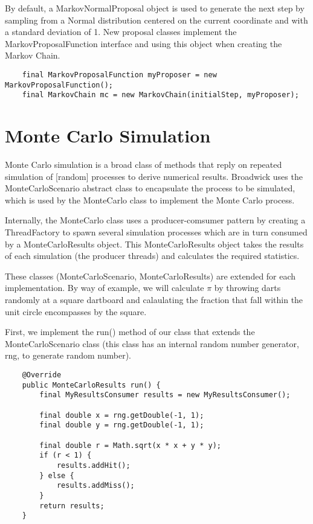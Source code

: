 By default, a MarkovNormalProposal object is used to generate the next step by sampling from a Normal distribution centered on the current coordinate and with a standard deviation of 1. New proposal classes implement the MarkovProposalFunction interface and using this object when creating the Markov Chain.

\begin{lstlisting}
    final MarkovProposalFunction myProposer = new MarkovProposalFunction();
    final MarkovChain mc = new MarkovChain(initialStep, myProposer);
\end{lstlisting}


\section{Monte Carlo Simulation}
Monte Carlo simulation is a broad class of methods that reply on repeated simulation of [random] processes to derive numerical results. Broadwick uses the MonteCarloScenario abstract class to encapsulate the process to be simulated, which is used by the MonteCarlo class to implement the Monte Carlo process.

Internally, the MonteCarlo class uses a producer-comsumer pattern by creating a ThreadFactory to spawn several simulation processes which are in turn consumed by a MonteCarloResults object. This MonteCarloResults object takes the results of each simulation (the producer threads) and calculates the required statistics.

These classes (MonteCarloScenario, MonteCarloResults) are extended for each implementation. By way of example, we will calculate $\pi$ by throwing darts randomly at a square dartboard and calaulating the fraction that fall within the unit circle encompasses by the square.

First, we implement the run() method of our class that extends the MonteCarloScenario class (this class has an internal random number generator, rng, to generate random number).
\begin{lstlisting}
    @Override
    public MonteCarloResults run() {
        final MyResultsConsumer results = new MyResultsConsumer();

        final double x = rng.getDouble(-1, 1);
        final double y = rng.getDouble(-1, 1);

        final double r = Math.sqrt(x * x + y * y);
        if (r < 1) {
            results.addHit();
        } else {
            results.addMiss();
        }
        return results;
    }
\end{lstlisting}

